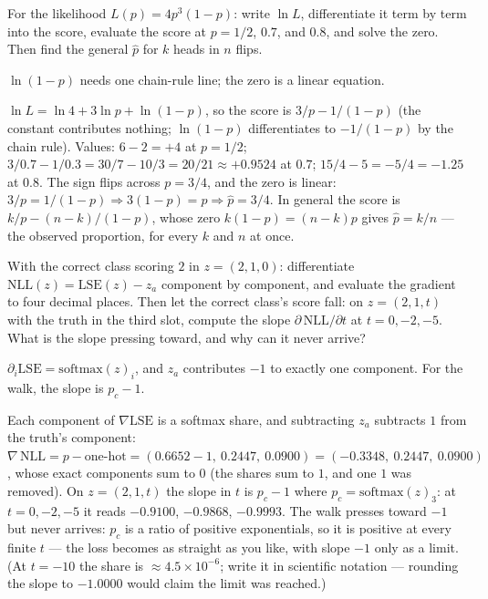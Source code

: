 \begin{problem}
For the likelihood $L(p) = 4p^3(1-p)$: write $\ln L$, differentiate
it term by term into the score, evaluate the score at $p = 1/2$,
$0.7$, and $0.8$, and solve the zero. Then find the general
$\hat{p}$ for $k$ heads in $n$ flips.
\begin{hint}
$\ln(1-p)$ needs one chain-rule line; the zero is a linear equation.
\end{hint}
\begin{solution}
$\ln L = \ln 4 + 3 \ln p + \ln(1-p)$, so the score is
$3/p - 1/(1-p)$ (the constant contributes nothing; $\ln(1-p)$
differentiates to $-1/(1-p)$ by the chain rule). Values:
$6 - 2 = +4$ at $p = 1/2$; $3/0.7 - 1/0.3 = 30/7 - 10/3 = 20/21
\approx +0.9524$ at $0.7$; $15/4 - 5 = -5/4 = -1.25$ at $0.8$. The
sign flips across $p = 3/4$, and the zero is linear:
$3/p = 1/(1-p) \Rightarrow 3(1-p) = p \Rightarrow \hat{p} = 3/4$. In
general the score is $k/p - (n-k)/(1-p)$, whose zero
$k(1-p) = (n-k)p$ gives $\hat{p} = k/n$ — the observed proportion,
for every $k$ and $n$ at once.
\end{solution}
\end{problem}

\begin{problem}[stretch]
With the correct class scoring $2$ in $z = (2, 1, 0)$: differentiate
$\mathrm{NLL}(z) = \mathrm{LSE}(z) - z_a$ component by component,
and evaluate the gradient to four decimal places. Then let the
correct class's score fall: on $z = (2, 1, t)$ with the truth in the
third slot, compute the slope $\partial\,\mathrm{NLL}/\partial t$ at
$t = 0, -2, -5$. What is the slope pressing toward, and why can it
never arrive?
\begin{hint}
$\partial_i \mathrm{LSE} = \mathrm{softmax}(z)_i$, and $z_a$
contributes $-1$ to exactly one component. For the walk, the slope
is $p_c - 1$.
\end{hint}
\begin{solution}
Each component of $\nabla \mathrm{LSE}$ is a softmax share, and
subtracting $z_a$ subtracts $1$ from the truth's component:
$\nabla\,\mathrm{NLL} = p - \text{one-hot} =
(0.6652 - 1,\ 0.2447,\ 0.0900) = (-0.3348,\ 0.2447,\ 0.0900)$,
whose exact components sum to $0$ (the shares sum to $1$, and one
$1$ was removed). On $z = (2, 1, t)$ the slope in $t$ is
$p_c - 1$ where $p_c = \mathrm{softmax}(z)_3$: at $t = 0, -2, -5$ it
reads $-0.9100$, $-0.9868$, $-0.9993$. The walk presses toward $-1$
but never arrives: $p_c$ is a ratio of positive exponentials, so it
is positive at every finite $t$ — the loss becomes as straight as
you like, with slope $-1$ only as a limit. (At $t = -10$ the share
is $\approx 4.5 \times 10^{-6}$; write it in scientific notation —
rounding the slope to $-1.0000$ would claim the limit was reached.)
\end{solution}
\end{problem}

